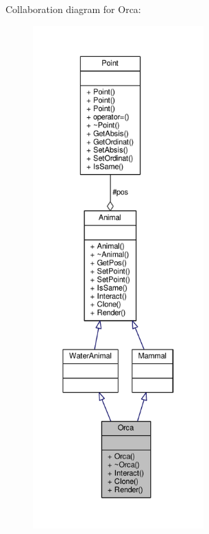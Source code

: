 Collaboration diagram for Orca\+:
\nopagebreak
\begin{figure}[H]
\begin{center}
\leavevmode
\includegraphics[height=550pt]{classOrca__coll__graph}
\end{center}
\end{figure}
